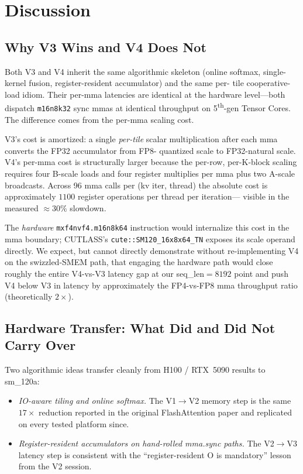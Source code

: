 \documentclass[conference]{IEEEtran}
\begin{document}
\section{Discussion}
\label{sec:disc}

\subsection{Why V3 Wins and V4 Does Not}

Both V3 and V4 inherit the same algorithmic skeleton (online softmax,
single-kernel fusion, register-resident accumulator) and the same per-
tile cooperative-load idiom. Their per-mma latencies are identical at
the hardware level---both dispatch \texttt{m16n8k32} sync mmas at
identical throughput on 5\textsuperscript{th}-gen Tensor Cores. The
difference comes from the per-mma scaling cost.

V3's cost is amortized: a single \emph{per-tile} scalar
multiplication after each mma converts the FP32 accumulator from FP8-
quantized scale to FP32-natural scale. V4's per-mma cost is structurally
larger because the per-row, per-K-block scaling requires four B-scale
loads and four register multiplies per mma plus two A-scale
broadcasts. Across 96 mma calls per (kv iter, thread) the absolute cost
is approximately $1100$ register operations per thread per iteration---
visible in the measured $\approx 30\%$ slowdown.

The \emph{hardware} \texttt{mxf4nvf4.m16n8k64} instruction would
internalize this cost in the mma boundary; CUTLASS's
\texttt{cute::SM120\_16x8x64\_TN} exposes its scale operand directly.
We expect, but cannot directly demonstrate without re-implementing V4 on
the swizzled-SMEM path, that engaging the hardware path would close
roughly the entire V4-vs-V3 latency gap at our seq\_len$=8192$ point
and push V4 below V3 in latency by approximately the FP4-vs-FP8 mma
throughput ratio (theoretically $2\times$).

\subsection{Hardware Transfer: What Did and Did Not Carry Over}

Two algorithmic ideas transfer cleanly from H100 / RTX~5090 results to
sm\_120a:
\begin{itemize}
  \item \emph{IO-aware tiling and online softmax.} The V1$\to$V2
        memory step is the same $17\times$ reduction reported in the
        original FlashAttention paper and replicated on every tested
        platform since.
  \item \emph{Register-resident accumulators on hand-rolled mma.sync
        paths.} The V2$\to$V3 latency step is consistent with the
        ``register-resident O is mandatory'' lesson from the V2
        session.
\end{itemize}
\end{document}
